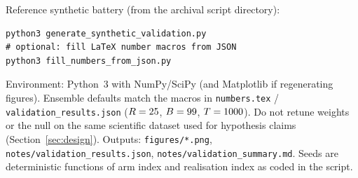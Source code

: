 \documentclass[11pt,a4paper]{article}
\begin{document}
Reference synthetic battery (from the archival script directory):
\begin{verbatim}
python3 generate_synthetic_validation.py
# optional: fill LaTeX number macros from JSON
python3 fill_numbers_from_json.py
\end{verbatim}
\noindent Environment: Python~3 with NumPy/SciPy (and Matplotlib if
regenerating figures). Ensemble defaults match the macros in
\texttt{numbers.tex} / \texttt{validation\_results.json}
($R=25$, $B=99$, $T=1000$). Do not retune weights or the null on
the same scientific dataset used for hypothesis claims
(Section~\ref{sec:design}).
Outputs: \texttt{figures/*.png}, \texttt{notes/validation\_results.json},
\texttt{notes/validation\_summary.md}. Seeds are deterministic functions of
arm index and realisation index as coded in the script.
\end{document}
